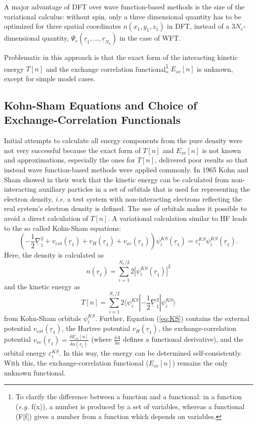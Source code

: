 \documentclass[11pt,DIV=13,BCOR=5mm,a4paper,headinclude]{scrbook}
\renewcommand{\vec}[1]{\underline{#1}}
\begin{document}
A major advantage of DFT over wave function-based methods is the size of the variational calculus: without spin, only a three dimensional quantity has to be optimized for three spatial coordinates $n(x_1,y_1,z_1)$ in DFT, instead of a $3N_e$-dimensional quantity, $\Psi_e(\vec{r}_1,...,\vec{r}_{N_e})$ in the case of WFT. %

Problematic in this approach is that the exact form of the interacting kinetic energy $T[n]$ and the exchange correlation functional\footnote{To clarify the difference between a function and a functional: in a function (\textit{e.g.} f(x)), a number is produced by a set of variables, whereas a functional (F[f]) gives a number from a function which depends on variables.} $E_{xc}[n]$ is unknown, except for simple model cases.

\subsection{Kohn-Sham Equations and Choice of Exchange-Correlation Functionals}
Initial attempts to calculate all energy components from the pure density were not very successful because the exact form of $T[n]$ and $E_{xc}[n]$ is not known and approximations, especially the ones for $T[n]$, delivered poor results so that instead wave function-based methods were applied commonly.
In 1965 Kohn and Sham showed in their work\cite{Kohn-Sham1965} that the kinetic energy can be calculated from non-interacting auxiliary particles in a set of orbitals that is used for representing the electron density, \textit{i.e.} a test system with non-interacting electrons reflecting the real system's electron density is defined.
The use of orbitals makes it possible to avoid a direct calculation of $T[n]$\cite{Gross03}. %
A variational calculation similar to HF leads to the so called Kohn-Sham equations:
\begin{equation}\label{eq:KS}
 \left(-\frac{1}{2}\vec{\nabla}^2_1 + v_{ext}(\vec{r}_1) + v_{H}(\vec{r}_1) + v_{xc}(\vec{r}_1) \right)\psi^{KS}_i(\vec{r}_1) = \varepsilon_i^{KS}\psi^{KS}_i(\vec{r}_1).
\end{equation}
Here, the density is calculated as
\begin{equation}
n(\vec{r}_1)=\sum_{i=1}^{N_e/2}2|\psi_i^{KS}(\vec{r}_1)|^2
\end{equation}
 and the kinetic energy as
 \begin{equation}
 T[n]=\sum_{i=1}^{N_e/2}2\langle\psi_i^{KS}|-\frac{1}{2}\vec{\nabla}_1^2|\psi_i^{KS}\rangle
 \end{equation}
 from Kohn-Sham orbitals $\psi_i^{KS}$.
Further, Equation (\ref{eq:KS}) contains the external potential $v_{ext}(\vec{r}_1)$, the Hartree potential $v_{H}(\vec{r}_1)$, the exchange-correlation potential $v_{xc}(\vec{r}_1)=\frac{\delta E_{xc}[n]}{\delta n(\vec{r}_1)}$ (where $\frac{\delta A}{\delta n}$ defines a functional derivative), and the orbital energy $\varepsilon_i^{KS}$.
In this way, the energy can be determined self-consistently.
With this, the exchange-correlation functional ($E_{xc}[n]$) remains the only unknown functional.
\end{document}
